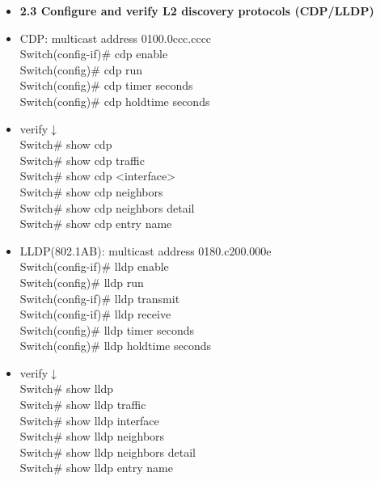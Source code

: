 \documentclass{article}
\begin{document}
\begin{itemize}
  \item \textbf{2.3 Configure and verify L2 discovery protocols (CDP/LLDP)}
  	\item[] CDP: multicast address 0100.0ccc.cccc\\
  		Switch(config-if)\# cdp enable\\
  		Switch(config)\# cdp run\\
  		Switch(config)\# cdp timer seconds\\
  		Switch(config)\# cdp holdtime seconds
  	\item[] verify$\downarrow$\\
  		Switch\# show cdp\\
  		Switch\# show cdp traffic\\
  		Switch\# show cdp \textless interface\textgreater\\
  		Switch\# show cdp neighbors\\
  		Switch\# show cdp neighbors detail\\
  		Switch\# show cdp entry name
  	\item[] LLDP(802.1AB): multicast address 0180.c200.000e\\
  		Switch(config-if)\# lldp enable\\
  		Switch(config)\# lldp run\\
  		Switch(config-if)\# lldp transmit\\
  		Switch(config-if)\# lldp receive\\
  		Switch(config)\# lldp timer seconds\\
  		Switch(config)\# lldp holdtime seconds
  	\item verify$\downarrow$\\
  		Switch\# show lldp\\
  		Switch\# show lldp traffic\\
  		Switch\# show lldp interface\\
  		Switch\# show lldp neighbors\\
  		Switch\# show lldp neighbors detail\\
  		Switch\# show lldp entry name
  		

\end{itemize}
\end{document}
